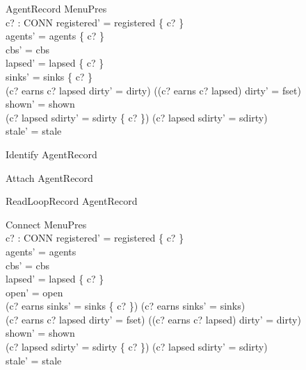 \documentclass[a4paper,10pt,fleqn]{article}
\begin{document}
\begin{schema}{AgentRecord}
  \Delta MenuPres \\
  c? : CONN
\where
  registered' = registered \cup \{ c? \} \\
  agents' = agents \cup \{ c? \} \\
  cbs' = cbs \\
  lapsed' = lapsed \setminus \{ c? \} \\
  sinks' = sinks \oplus \{ c?  \} \\
  (c? \in earns \land c? \notin lapsed \land dirty' = dirty) \lor
    ((c? \notin earns \lor c? \in lapsed) \land dirty' = fset) \\
  shown' = shown \\
  (c? \in lapsed \land sdirty' = sdirty \cup \{ c? \}) \lor
    (c? \notin lapsed \land sdirty' = sdirty) \\
  stale' = stale
\end{schema}

\begin{zed}
  Identify  AgentRecord \land [\Delta MenuPres | open' = open]
\end{zed}

\begin{zed}
  Attach  AgentRecord \land [\Delta MenuPres; c? : CONN | open' = open \cup \{ c? \}]
\end{zed}

\begin{zed}
  ReadLoopRecord  AgentRecord \land
    [\Delta MenuPres; c? : CONN | open' = open \land c? \in open]
\end{zed}

\begin{schema}{Connect}
  \Delta MenuPres \\
  c? : CONN
\where
  registered' = registered \cup \{ c? \} \\
  agents' = agents \\
  cbs' = cbs \\
  lapsed' = lapsed \setminus \{ c? \} \\
  open' = open \\
  (c? \in earns \land sinks' = sinks \oplus \{ c?  \}) \lor
    (c? \notin earns \land sinks' = sinks) \\
  (c? \in earns \land c? \in lapsed \land dirty' = fset) \lor
    (\lnot (c? \in earns \land c? \in lapsed) \land dirty' = dirty) \\
  shown' = shown \\
  (c? \in lapsed \land sdirty' = sdirty \cup \{ c? \}) \lor
    (c? \notin lapsed \land sdirty' = sdirty) \\
  stale' = stale
\end{schema}
\end{document}
